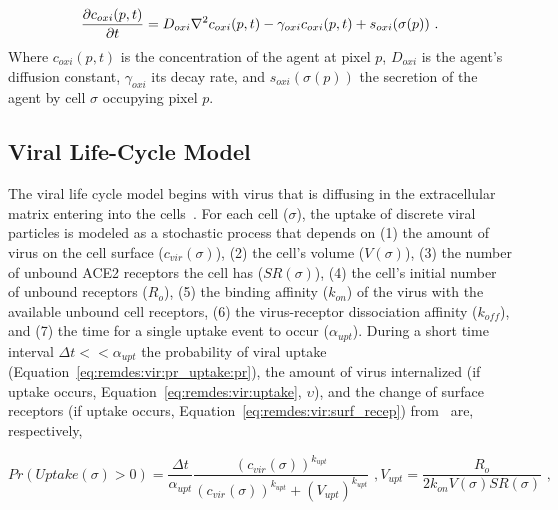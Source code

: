 \begin{equation}
    \frac{\partial c_{oxi}(p, t)}{\partial t} = D_{oxi}\nabla^2 c_{oxi}(p, t) - \gamma_{oxi} c_{oxi}(p, t) + s_{oxi}(\sigma(p))\,\,.
\end{equation}
\noindent Where $c_{oxi}(p, t)$ is the concentration of the agent at pixel $p$, $D_{oxi}$ is the agent's diffusion constant, $\gamma_{oxi}$ its decay rate, and $s_{oxi}(\sigma(p))$ the secretion of the agent by cell $\sigma$ occupying pixel $p$.




\subsection{Viral Life-Cycle Model}\label{sec:remdes:met:viral_life}


The viral life cycle model begins with virus that is diffusing in the extracellular matrix entering into the cells~\cite{sego_modular_2020}. For each cell ($\sigma$), the uptake of discrete viral particles is modeled as a stochastic process that depends on (1) the amount of virus on the cell surface ($c_{vir}(\sigma)$), (2) the cell's volume ($V(\sigma)$), (3) the number of unbound ACE2 receptors the cell has ($SR(\sigma)$), (4) the cell's initial number of unbound receptors ($R_o$), (5) the binding affinity ($k_{on}$) of the virus with the available unbound cell receptors, (6) the virus-receptor dissociation affinity ($k_{off}$), and (7) the time for a single uptake event to occur ($\alpha_{upt}$). During a short time interval $\Delta t<<\alpha_{upt}$ the probability of viral uptake (Equation~\ref{eq:remdes:vir:pr_uptake:pr}), the amount of virus internalized (if uptake occurs, Equation~\ref{eq:remdes:vir:uptake}, $\upsilon$), and the change of surface receptors (if uptake occurs, Equation~\ref{eq:remdes:vir:surf_recep}) from~\cite{sego_modular_2020} are, respectively,

\begin{subequations}\label{eq:remdes:vir:pr_uptake}

\begin{equation}\label{eq:remdes:vir:pr_uptake:pr}
    Pr(Uptake(\sigma)>0) = \frac{\Delta t}{\alpha_{upt}}\frac{(c_{vir}(\sigma))^{k_{upt}}}{(c_{vir}(\sigma))^{k_{upt}}+(V_{upt})^{k_{upt}}}\,\,,
\end{equation}

\begin{equation}\label{eq:remdes:vir:pr_uptake:vupt}
    V_{upt} = \frac{R_o}{2k_{on}V(\sigma)SR(\sigma)}\,\,,
\end{equation}
\end{subequations}

